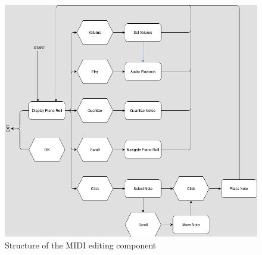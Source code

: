 \begin{figure}[h!]
  \centering
  \includegraphics[width=\linewidth]{image/DAW.png}
  \caption{Structure of the MIDI editing component}
  \label{fig:daw_diagram}
\end{figure}
\clearpage
